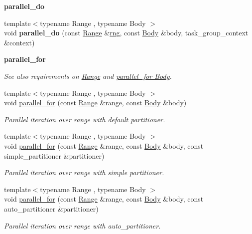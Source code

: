 \begin{Indent}{\bf parallel\+\_\+do}
\begin{DoxyCompactItemize}
\item 
\hypertarget{group__algorithms_ga40258ae16882a49d5d579407c88b3281}{}{\footnotesize template$<$typename Range , typename Body $>$ }\\void {\bfseries parallel\+\_\+do} (const \hyperlink{classtbb_1_1blocked__range}{Range} \&\hyperlink{structrng}{rng}, const \hyperlink{classBody}{Body} \&body, task\+\_\+group\+\_\+context \&context)\label{group__algorithms_ga40258ae16882a49d5d579407c88b3281}

\end{DoxyCompactItemize}
\end{Indent}
\begin{Indent}{\bf parallel\+\_\+for}\par
{\em See also requirements on \hyperlink{range_req}{Range} and \hyperlink{parallel_for_body_req}{parallel\+\_\+for Body}. }\begin{DoxyCompactItemize}
\item 
{\footnotesize template$<$typename Range , typename Body $>$ }\\void \hyperlink{group__algorithms_gaa8444c29dc4d2e527a1036717d109aef}{parallel\+\_\+for} (const \hyperlink{classtbb_1_1blocked__range}{Range} \&range, const \hyperlink{classBody}{Body} \&body)
\begin{DoxyCompactList}\small\item\em Parallel iteration over range with default partitioner. \end{DoxyCompactList}\item 
{\footnotesize template$<$typename Range , typename Body $>$ }\\void \hyperlink{group__algorithms_ga9722d2bc7e5edb4fae9f3b55268a1ecc}{parallel\+\_\+for} (const \hyperlink{classtbb_1_1blocked__range}{Range} \&range, const \hyperlink{classBody}{Body} \&body, const simple\+\_\+partitioner \&partitioner)
\begin{DoxyCompactList}\small\item\em Parallel iteration over range with simple partitioner. \end{DoxyCompactList}\item 
{\footnotesize template$<$typename Range , typename Body $>$ }\\void \hyperlink{group__algorithms_gad6c4b06f96ae33cefe78235841791902}{parallel\+\_\+for} (const \hyperlink{classtbb_1_1blocked__range}{Range} \&range, const \hyperlink{classBody}{Body} \&body, const auto\+\_\+partitioner \&partitioner)
\begin{DoxyCompactList}\small\item\em Parallel iteration over range with auto\+\_\+partitioner. \end{DoxyCompactList}\item 

\end{DoxyCompactItemize}
\end{Indent}
